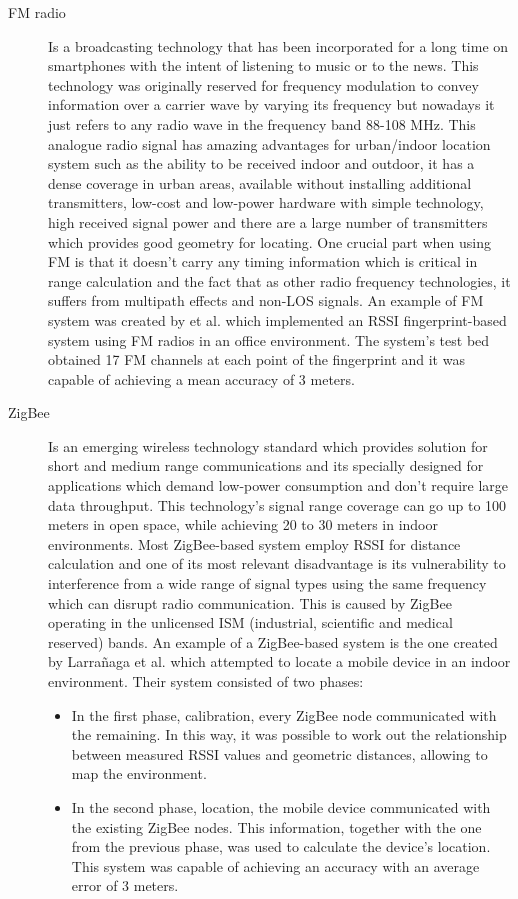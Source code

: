 \begin{description}
  
\item [\ac{FM} radio]  Is a broadcasting technology that has been incorporated for a long time on smartphones with the intent of listening to music or to the news. This technology was originally reserved for frequency modulation to convey information over a carrier wave by varying its frequency but nowadays it just refers to any radio wave in the frequency band 88-108 MHz. This analogue radio signal has amazing advantages for urban/indoor location system such as the ability to be received indoor and outdoor, it has a dense coverage in urban areas, available without installing additional transmitters, low-cost and low-power hardware with simple technology, high received signal power and there are a large number of transmitters which provides good geometry for locating. One crucial part when using \ac{FM} is that it doesn't carry any timing information which is critical in range calculation and the fact that as other radio frequency technologies, it suffers from  multipath effects and non-\ac{LOS} signals. An example of FM system was created by  et al. \cite{fm} which implemented an \ac{RSSI} fingerprint-based system using FM radios in an office environment. The system's test bed obtained 17 FM channels at each point of the fingerprint and it was capable of achieving a mean accuracy of 3 meters.  
  
  
  
  
\item [ZigBee]  Is an emerging wireless technology standard which provides solution for short and medium range communications and its specially designed for applications which demand low-power consumption and don't require large data throughput. This technology's signal range coverage can go up to 100 meters in open space, while achieving 20 to 30 meters in indoor environments. Most ZigBee-based system employ \ac{RSSI} for distance calculation and one of its most relevant disadvantage is its vulnerability to interference from a wide range of signal types using the same frequency which can disrupt radio communication. This is caused by ZigBee operating in the unlicensed ISM (industrial, scientific and medical reserved) bands. An example of a ZigBee-based system is the one created by Larrañaga et al. \cite{zigbee} which attempted to locate a mobile device in an indoor environment. Their system consisted of two phases:  
\begin{itemize} 
\item In the first phase, calibration, every ZigBee node communicated with the remaining. In this way, it was possible to work out the relationship between measured \ac{RSSI} values and geometric distances, allowing to map the environment. 
\item In the second phase, location, the mobile device communicated with the existing ZigBee nodes. This information, together with the one from the previous phase, was used to calculate the device's location. This system was capable of achieving an accuracy with an average error of 3 meters.    
\end{itemize} 
  

\end{description}
